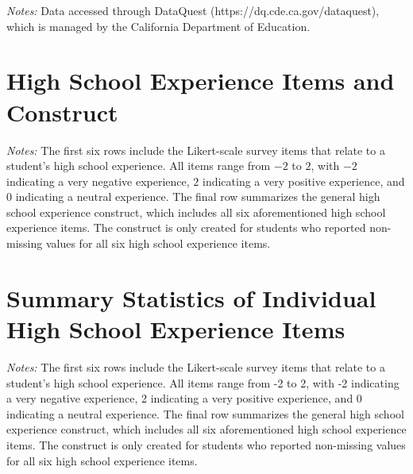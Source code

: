 \begin{table}[!ht]
\centering
\caption{Demographic Characteristics of California Students Enrolled in 12th Grade (2022-2023 Academic Year)}
\label{tab:cde_enrollment}

\medskip
\begin{minipage}{\linewidth}
\noindent\footnotesize\textit{Notes:} Data accessed through DataQuest
(https://dq.cde.ca.gov/dataquest), which is managed by the California
Department of Education.
\end{minipage}
\end{table}

\section{High School Experience Items and Construct}\label{appendix-b-high-school-experience-items-and-construct}
\begin{table}[!ht]
\centering
\caption{High School Experience Items and Construct}
\label{tab:hsexp_items_construct}

\medskip
\begin{minipage}{\linewidth}
\noindent\footnotesize\textit{Notes:} The first six rows include the
Likert-scale survey items that relate to a student's high school
experience. All items range from $-2$ to $2$, with $-2$ indicating a
very negative experience, $2$ indicating a very positive experience,
and $0$ indicating a neutral experience. The final row summarizes the
general high school experience construct, which includes all six
aforementioned high school experience items. The construct is only
created for students who reported non-missing values for all six high
school experience items.
\end{minipage}
\end{table}

\section{Summary Statistics of Individual High School Experience Items}\label{appendix-c-summary-statistics-of-individual-high-school-experience-items}
\begin{table}
\centering
\caption{High School Experience Items by Gender Identity}
\label{tab:hsexp_items_by_gender}
\footnotesize
\setlength{\tabcolsep}{3pt}

\medskip
\begin{minipage}{\linewidth}
\noindent\footnotesize\textit{Notes:} The first six rows include the Likert-scale survey items that
relate to a student's high school experience. All items range from -2 to
2, with -2 indicating a very negative experience, 2 indicating a very
positive experience, and 0 indicating a neutral experience. The final
row summarizes the general high school experience construct, which
includes all six aforementioned high school experience items. The
construct is only created for students who reported non-missing values
for all six high school experience items.
\end{minipage}
\end{table}

